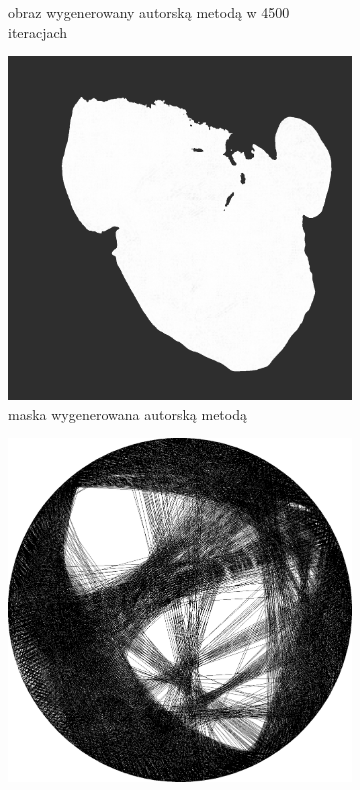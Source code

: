 \begin{figure}[H]
\begin{subfigure}{0.24\textwidth}
        \caption{obraz wygenerowany autorską metodą w 4500 iteracjach}
        \label{comp-comp-magdalene-k}
    \end{subfigure}
    \begin{subfigure}{0.24\textwidth}
        \centering
        \includegraphics[width = \textwidth]{img/6-comp/magdalene_mask_c20_inv0_bg10_obj1_ed1.png}
        \caption{maska wygenerowana autorską metodą}
        \label{comp-comp-magdalene-l}
    \end{subfigure}
    \begin{subfigure}{0.24\textwidth}
        \centering
        \includegraphics[width = \textwidth]{img/6-comp/magdalene_e_i3500_c20_inv0_bg10_obj1_ed1.png}

\end{subfigure}
\end{figure}
